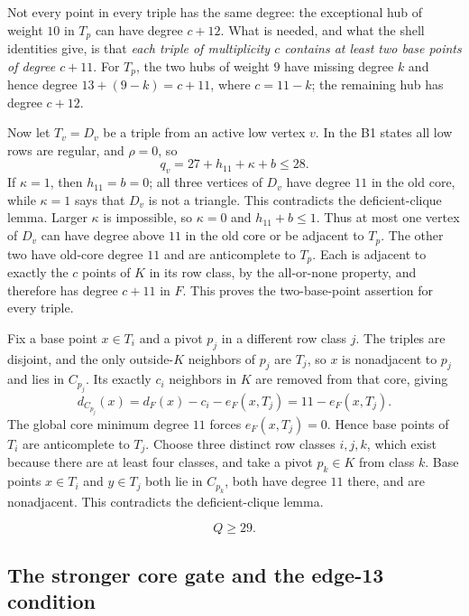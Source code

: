 Not every point in every triple has the same degree: the exceptional hub of weight $10$ in $T_p$ can have degree $c+12$. What is needed, and what the shell identities give, is that \emph{each triple of multiplicity $c$ contains at least two base points of degree $c+11$}. For $T_p$, the two hubs of weight $9$ have missing degree $k$ and hence degree $13+(9-k)=c+11$, where $c=11-k$; the remaining hub has degree $c+12$.

Now let $T_v=D_v$ be a triple from an active low vertex $v$. In the B1 states all low rows are regular, and $\rho=0$, so
\[
q_v=27+h_{11}+\kappa+b\leq28.
\]
If $\kappa=1$, then $h_{11}=b=0$; all three vertices of $D_v$ have degree $11$ in the old core, while $\kappa=1$ says that $D_v$ is not a triangle. This contradicts the deficient-clique lemma. Larger $\kappa$ is impossible, so $\kappa=0$ and $h_{11}+b\leq1$. Thus at most one vertex of $D_v$ can have degree above $11$ in the old core or be adjacent to $T_p$. The other two have old-core degree $11$ and are anticomplete to $T_p$. Each is adjacent to exactly the $c$ points of $K$ in its row class, by the all-or-none property, and therefore has degree $c+11$ in $F$. This proves the two-base-point assertion for every triple.

Fix a base point $x\in T_i$ and a pivot $p_j$ in a different row class $j$. The triples are disjoint, and the only outside-$K$ neighbors of $p_j$ are $T_j$, so $x$ is nonadjacent to $p_j$ and lies in $C_{p_j}$. Its exactly $c_i$ neighbors in $K$ are removed from that core, giving
\[
d_{C_{p_j}}(x)=d_F(x)-c_i-e_F(x,T_j)=11-e_F(x,T_j).
\]
The global core minimum degree $11$ forces $e_F(x,T_j)=0$. Hence base points of $T_i$ are anticomplete to $T_j$. Choose three distinct row classes $i,j,k$, which exist because there are at least four classes, and take a pivot $p_k\in K$ from class $k$. Base points $x\in T_i$ and $y\in T_j$ both lie in $C_{p_k}$, both have degree $11$ there, and are nonadjacent. This contradicts the deficient-clique lemma.

\begin{equation}
Q\geq29.
\label{eq:Q29}
\end{equation}

\subsection{The stronger core gate and the edge-13 condition}

